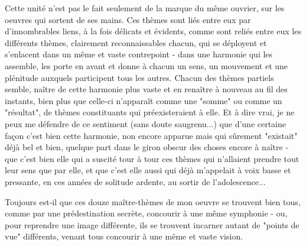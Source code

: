 Cette unité n'est pas le fait seulement de la marque du même ouvrier, sur les oeuvres qui sortent de ses mains. Ces thèmes sont liés entre eux par d'innombrables liens, à la fois délicats et évidents, comme sont reliés entre eux les différents thèmes, clairement reconnaissables chacun, qui se déployent et s'enlacent dans un même et vaste contrepoint - dans une harmonie qui les assemble, les porte en avant et donne à chacun un sens, un mouvement et une plénitude auxquels participent tous les autres. Chacun des thèmes partiels semble, naître de cette harmonie plus vaste et en renaître à nouveau au fil des instants, bien plus que celle-ci n'apparaît comme une "somme" ou comme un "résultat", de thèmes constituants qui préexisteraient à elle. Et à dire vrai, je ne peux me défendre de ce sentiment (sans doute saugrenu...) que d'une certaine façon c'est bien cette harmonie, non encore apparue mais qui sûrement "existait" déjà bel et bien, quelque part dans le giron obscur des choses encore à naître - que c'est bien elle qui a suscité tour à tour ces thèmes qui n'allaient prendre tout leur sens que par elle, et que c'est elle aussi qui déjà m'appelait à voix basse et pressante, en ces années de solitude ardente, au sortir de l'adolescence...

Toujours est-il que ces douze maître-thèmes de mon oeuvre se trouvent bien tous, comme par une prédestination secrète, concourir à une même symphonie - ou, pour reprendre une image différente, ils se trouvent incarner autant de "points de vue" différents, venant tous concourir à une même et vaste vision.

